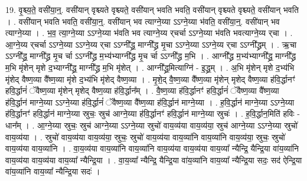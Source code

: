 \documentclass[17pt]{extarticle}
\begin{document}
19. वृ॒श्च्य॒ते॒ वसी॑या॒न्॒. वसी॑यान् वृश्च्यते वृश्च्यते॒ वसी॑यान् भवति भवति॒ वसी॑यान् वृश्च्यते वृश्च्यते॒ वसी॑यान् भवति । . वसी॑यान् भवति भवति॒ वसी॑या॒न्॒. वसी॑यान् भव त्याग्ने॒य्या ऽऽग्ने॒य्या भ॑वति॒ वसी॑या॒न्॒. वसी॑यान् भव त्याग्ने॒य्या । . भ॒व॒ त्या॒ग्ने॒य्या ऽऽग्ने॒य्या भ॑वति भव त्याग्ने॒य्य र्‌चर्चा ऽऽग्ने॒य्या भ॑वति भवत्याग्ने॒य्य र्‌चा । . आ॒ग्ने॒य्य र्‌चर्चा ऽऽग्ने॒य्या ऽऽग्ने॒य्य र्‌चा ऽऽग्नी᳚द्ध्र॒ माग्नी᳚द्ध्र मृ॒चा ऽऽग्ने॒य्या ऽऽग्ने॒य्य र्‌चा ऽऽग्नी᳚द्ध्रम् । . ऋ॒चा ऽऽग्नी᳚द्ध्र॒ माग्नी᳚द्ध्र मृ॒च ‌र्चा ऽऽग्नी᳚द्ध्र म॒भ्य॑भ्याग्नी᳚द्ध्र मृ॒च ‌र्चा ऽऽग्नी᳚द्ध्र म॒भि । . आग्नी᳚द्ध्र म॒भ्य॑भ्याग्नी᳚द्ध्र॒ माग्नी᳚द्ध्र म॒भि मृ॑शेन् मृशे द॒भ्याग्नी᳚द्ध्र॒ माग्नी᳚द्ध्र म॒भि मृ॑शेत् । . आग्नी᳚द्ध्र॒मित्याग्नि॑ - इ॒द्ध्र॒म् । . अ॒भि मृ॑शेन् मृशे द॒भ्य॑भि मृ॑शेद् वैष्ण॒व्या वै᳚ष्ण॒व्या मृ॑शे द॒भ्य॑भि मृ॑शेद् वैष्ण॒व्या । . मृ॒शे॒द् वै॒ष्ण॒व्या वै᳚ष्ण॒व्या मृ॑शेन् मृशेद् वैष्ण॒व्या ह॑वि॒र्द्धानꣳ॑ हवि॒र्द्धानं॑ ॅवैष्ण॒व्या मृ॑शेन् मृशेद् वैष्ण॒व्या ह॑वि॒र्द्धान᳚म् । . वै॒ष्ण॒व्या ह॑वि॒र्द्धानꣳ॑ हवि॒र्द्धानं॑ ॅवैष्ण॒व्या वै᳚ष्ण॒व्या ह॑वि॒र्द्धान॑ माग्ने॒य्या ऽऽग्ने॒य्या ह॑वि॒र्द्धानं॑ ॅवैष्ण॒व्या वै᳚ष्ण॒व्या ह॑वि॒र्द्धान॑ माग्ने॒य्या । . ह॒वि॒र्द्धान॑ माग्ने॒य्या ऽऽग्ने॒य्या ह॑वि॒र्द्धानꣳ॑ हवि॒र्द्धान॑ माग्ने॒य्या स्रुचः॒ स्रुच॑ आग्ने॒य्या ह॑वि॒र्द्धानꣳ॑ हवि॒र्द्धान॑ माग्ने॒य्या स्रुचः॑ । . ह॒वि॒र्द्धान॒मिति॑ हविः - धान᳚म् । . आ॒ग्ने॒य्या स्रुचः॒ स्रुच॑ आग्ने॒य्या ऽऽग्ने॒य्या स्रुचो॑ वाय॒व्य॑या वाय॒व्य॑या॒ स्रुच॑ आग्ने॒य्या ऽऽग्ने॒य्या स्रुचो॑ वाय॒व्य॑या । . स्रुचो॑ वाय॒व्य॑या वाय॒व्य॑या॒ स्रुचः॒ स्रुचो॑ वाय॒व्य॑या वाय॒व्या॑नि वाय॒व्या॑नि वाय॒व्य॑या॒ स्रुचः॒ स्रुचो॑ वाय॒व्य॑या वाय॒व्या॑नि । . वा॒य॒व्य॑या वाय॒व्या॑नि वाय॒व्या॑नि वाय॒व्य॑या वाय॒व्य॑या वाय॒व्या᳚ न्यैन्द्रि॒ यैन्द्रि॒या वा॑य॒व्या॑नि वाय॒व्य॑या वाय॒व्य॑या वाय॒व्या᳚ न्यैन्द्रि॒या । . वा॒य॒व्या᳚ न्यैन्द्रि॒ यैन्द्रि॒या वा॑य॒व्या॑नि वाय॒व्या᳚ न्यैन्द्रि॒या सदः॒ सद॑ ऐन्द्रि॒या वा॑य॒व्या॑नि वाय॒व्या᳚ न्यैन्द्रि॒या सदः॑ । \newline
\end{document}
